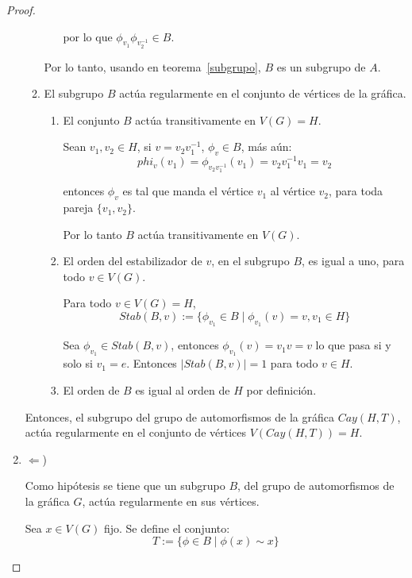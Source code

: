 \documentclass[11pt]{book}
\theoremstyle{definition}
\begin{document}
\begin{proof}
\begin{enumerate}
\begin{enumerate}
\begin{enumerate}
por lo que $\phi_{v_1}\phi_{v_2^{-1}} \in B$.
\end{enumerate}

Por lo tanto, usando en teorema~\ref{subgrupo}, $B$ es un subgrupo de
$A$.
 
\item
El subgrupo $B$ actúa regularmente en el conjunto de vértices de la gráfica.

\begin{enumerate}
\item\label{sab11} El conjunto $B$ actúa transitivamente en $V(G)=H$. 

Sean $v_1,v_2\in H$, si
  $v=v_2v_1^{-1}$, $\phi_v \in B$, más aún:
\begin{equation*}
phi_v(v_1)=\phi_{v_2v_1^{-1}}(v_1)=v_2v_1^{-1}v_1=v_2
\end{equation*}

entonces $\phi_v$ es tal que manda el vértice $v_1$ al vértice $v_2$,
para toda pareja $\{v_1,v_2\}$.

Por lo tanto $B$ actúa transitivamente en $V(G)$.

\item \label{sab12}
El orden del estabilizador de $v$, en el subgrupo $B$, es igual a uno, para todo
$v \in V(G)$. 

Para todo $v\in V(G)=H$, \begin{equation*}Stab(B,v):=\{\phi_{v_1}
  \in B \mid \phi_{v_1}(v)=v, v_1\in H \}\end{equation*}

  Sea $\phi_{v_1}\in Stab(B,v)$, entonces $\phi_{v_1}(v)=v_1v=v$ lo
  que pasa si y
  solo si $v_1=e$. Entonces $|Stab(B,v)| = 1$ para todo $v\in H$.
\item \label{sab13}El orden de $B$ es igual al orden de $H$ por definición.
\end{enumerate}
\end{enumerate}
Entonces, el subgrupo del
grupo de automorfismos de la gráfica $Cay(H,T)$,  actúa regularmente en
el conjunto de vértices $V(Cay(H,T))=H$. 

\smallskip

\item $\Leftarrow$) 

Como hipótesis se tiene que un subgrupo $B$, del grupo de automorfismos de
la gráfica $G$, actúa regularmente en sus vértices. 

Sea $x \in V(G)$ fijo. Se define el conjunto:
\begin{equation*} T:=\{
\phi \in B \mid \phi(x)\sim x\}\end{equation*}
\begin{enumerate}


\end{enumerate}
\end{enumerate}
\end{proof}
\end{document}
